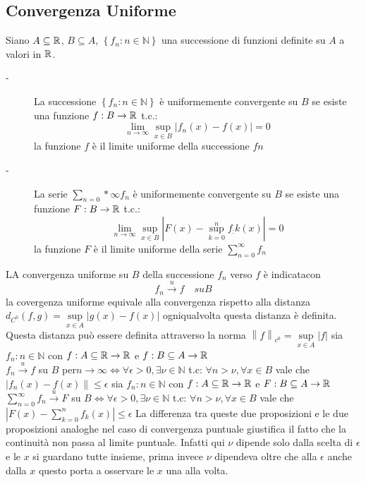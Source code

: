 \subsection{Convergenza Uniforme}
Siano $A\subseteq \mathbb{R}$, $B\subseteq A$, $\left\{f_n:n\in\mathbb{N}\right\}$ una successione di funzioni definite su $A$ a  valori in $ \mathbb{R}$.
\begin{description}
	\item[-] La successione $\left\{f_n:n\in\mathbb{N}\right\}$ è uniformemente convergente su $B$ se esiste una funzione $f:B\to \mathbb{R}$ t.c.:
	$$\lim\limits_{n\to\infty} \sup\limits_{x\in B}\left|f_n(x)-f(x)\right|=0$$
	la funzione $f$ è il limite uniforme della successione $fn$
	\item[-] La serie $\sum\limits_{n=0}*{\infty}f_n$ è uniformemente convergente su $B$ se esiste una funzione $F:B\to \mathbb{R}$ t.c.:
	$$\lim\limits_{n\to\infty} \sup\limits_{x\in B}\left|F(x)-\sup\limits_{k=0}^{n}f_:k(x)\right|=0$$
	la funzione $F$ è il limite uniforme della serie $\sum\limits_{n=0}^{\infty}f_n$ 
\end{description}
\observation
LA convergenza uniforme su $B$ della successione $f_n$ verso $f$ è indicatacon
$$f_n\overset{u}{\to}f\quad su B$$
\observation
la covergenza uniforme equivale alla convergenza rispetto alla distanza $d_{C^0}(f,g)=\sup\limits_{x\in A}\left|g(x)-f(x)\right|$ ogniqualvolta questa distanza è definita.\\
Questa distanza può essere definita attraverso la norma $\left\| f\right\|_{c^0}=\sup\limits_{x\in A}\left|f\right|$
\proposition
sia $f_n:n\in\mathbb{N}$ con $f:A\subseteq \mathbb{R}\to \mathbb{R}$ e $f:B\subseteq A \to  \mathbb{R}$\\
$f_n\overset{u}{\to}f$ su $B$ per$n\to\infty \Leftrightarrow \forall\epsilon >0, \exists\nu\in\mathbb{N}$  t.c: $\forall n>\nu, \forall x\in B$ vale che $\left| f_n(x)-f(x)\right\|\le\epsilon$
\proposition
sia $f_n:n\in\mathbb{N}$ con $f:A\subseteq \mathbb{R}\to \mathbb{R}$ e $F:B\subseteq A \to  \mathbb{R}$\\
$\sum\limits_{n=0}^{\infty}f_n\overset{u}{\to}F$ su $B\Leftrightarrow \forall\epsilon >0, \exists\nu\in\mathbb{N}$  t.c: $\forall n>\nu, \forall x\in B$ vale che $\left| F(x)-\sum\limits_{k=0}^{n}f_k(x)\right|\le\epsilon$
\observation
La differenza tra queste due proposizioni e le due proposizioni analoghe nel caso di convergenza puntuale giustifica il fatto che la continuità non passa al limite puntuale. Infatti qui $\nu$ dipende solo dalla scelta di $\epsilon$ e le $x$ si guardano tutte insieme, prima invece $\nu$ dipendeva oltre che alla $\epsilon$ anche dalla $x$ questo porta a osservare le $x$ una alla volta.
